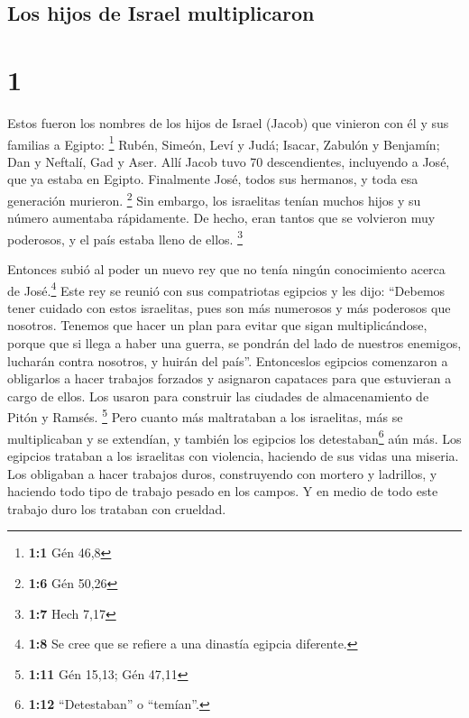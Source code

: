 \hypertarget{los-hijos-de-israel-multiplicaron}{%
\subsection{Los hijos de Israel
multiplicaron}\label{los-hijos-de-israel-multiplicaron}}

\hypertarget{section}{%
\section{1}\label{section}}

 Estos fueron los nombres de los hijos de Israel (Jacob)
que vinieron con él y sus familias a Egipto: \footnote{\textbf{1:1} Gén
  46,8}  Rubén, Simeón, Leví y Judá; 
Isacar, Zabulón y Benjamín;  Dan y Neftalí, Gad y Aser.
 Allí Jacob tuvo 70 descendientes, incluyendo a José, que
ya estaba en Egipto.  Finalmente José, todos sus hermanos,
y toda esa generación murieron. \footnote{\textbf{1:6} Gén 50,26}
 Sin embargo, los israelitas tenían muchos hijos y su
número aumentaba rápidamente. De hecho, eran tantos que se volvieron muy
poderosos, y el país estaba lleno de ellos. \footnote{\textbf{1:7} Hech
  7,17}

 Entonces subió al poder un nuevo rey que no tenía ningún
conocimiento acerca de José.\footnote{\textbf{1:8} Se cree que se
  refiere a una dinastía egipcia diferente.}  Este rey se
reunió con sus compatriotas egipcios y les dijo: ``Debemos tener cuidado
con estos israelitas, pues son más numerosos y más poderosos que
nosotros.  Tenemos que hacer un plan para evitar que
sigan multiplicándose, porque que si llega a haber una guerra, se
pondrán del lado de nuestros enemigos, lucharán contra nosotros, y
huirán del país''.  Entonceslos egipcios comenzaron a
obligarlos a hacer trabajos forzados y asignaron capataces para que
estuvieran a cargo de ellos. Los usaron para construir las ciudades de
almacenamiento de Pitón y Ramsés. \footnote{\textbf{1:11} Gén 15,13; Gén
  47,11}  Pero cuanto más maltrataban a los israelitas,
más se multiplicaban y se extendían, y también los egipcios los
detestaban\footnote{\textbf{1:12} ``Detestaban'' o ``temían''.} aún más.
 Los egipcios trataban a los israelitas con violencia,
 haciendo de sus vidas una miseria. Los obligaban a hacer
trabajos duros, construyendo con mortero y ladrillos, y haciendo todo
tipo de trabajo pesado en los campos. Y en medio de todo este trabajo
duro los trataban con crueldad.

